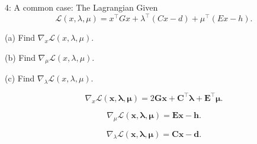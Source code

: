 

\begin{problem}{4: A common case: The Lagrangian}
Given
\[
  \mathcal{L}(x, \lambda, \mu) = x^{\top}Gx + \lambda^{\top}(Cx - d) + \mu^{\top}(Ex - h)
  .\]

(a) Find $\nabla_x\mathcal{L}(x, \lambda, \mu)$.

\medskip

(b) Find $\nabla_{\mu}\mathcal{L}(x, \lambda, \mu)$.

\medskip

(c) Find $\nabla_{\lambda}\mathcal{L}(x, \lambda, \mu)$.
\end{problem}



\[
  \nabla _x \mathcal{L}(\mathbf{x,\lambda, \mu}) = 2\mathbf{Gx} + \mathbf{C^{\top}\lambda} + \mathbf{E^{\top}\mu}
.\] 


\[
  \nabla _\mu \mathcal{L}(\mathbf{x, \lambda, \mu}) = \mathbf{Ex} - \mathbf{h}
.\] 


\[
  \nabla _\lambda \mathcal{L}(\mathbf{x, \lambda, \mu}) = \mathbf{Cx} - \mathbf{d}
.\] 